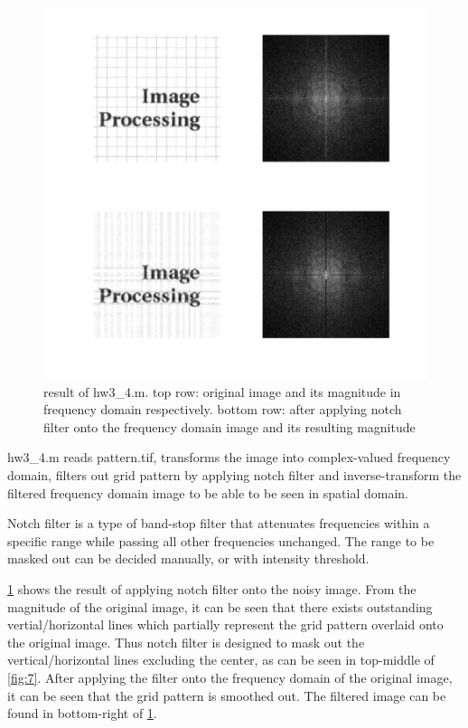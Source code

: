 \documentclass[extendedabs]{bmvc2k}
\begin{document}
\begin{figure}[h]
    \centering
    \includegraphics[width=\linewidth]{hw3_4_1}
    \caption{result of hw3\_4.m. top row: original image and its magnitude in frequency 
    domain respectively. bottom row: after applying notch filter onto the frequency domain image
    and its resulting magnitude}
    \label{fig:5}
\end{figure}

hw3\_4.m reads pattern.tif, transforms the image into complex-valued frequency domain, filters out grid pattern
by applying notch filter and inverse-transform the filtered frequency domain image to be able to be seen in spatial domain. 

Notch filter is a type of band-stop filter that attenuates frequencies within a specific range while
passing all other frequencies unchanged. The range to be masked out can be decided manually, or with 
intensity threshold. 

\figurename{\ref{fig:5}} shows the result of applying notch filter onto the noisy image.
From the magnitude of the original image, it can be seen that there exists outstanding
vertial/horizontal lines which partially represent the grid pattern overlaid onto the original
image. Thus notch filter is designed to mask out the vertical/horizontal lines excluding the center, 
as can be seen in top-middle of \figurename{\ref{fig:7}}. After applying the filter onto the frequency
domain of the original image, it can be seen that the grid pattern is smoothed out. The filtered
image can be found in bottom-right of \figurename{\ref{fig:5}}.
\end{document}
